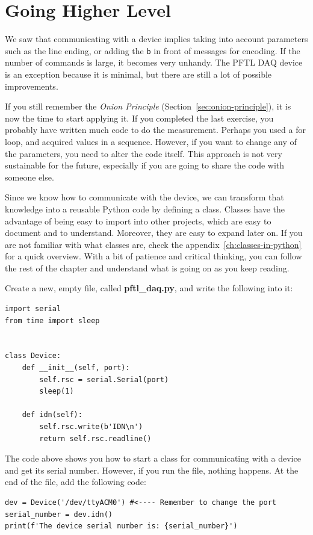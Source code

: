 \section{Going Higher Level}\label{sec:going-higher-level}
We saw that communicating with a device implies taking into account parameters such as the line ending, or adding the \texttt{b} in front of messages for encoding. If the number of commands is large, it becomes very unhandy. The {PFTL DAQ} device is an exception because it is minimal, but there are still a lot of possible improvements.

If you still remember the \emph{Onion Principle} (Section~\ref{sec:onion-principle}), it is now the time to start applying it. If you completed the last exercise, you probably have written much code to do the measurement. Perhaps you used a for loop, and acquired values in a sequence. However, if you want to change any of the parameters, you need to alter the code itself. This approach is not very sustainable for the future, especially if you are going to share the code with someone else.

Since we know how to communicate with the device, we can transform that knowledge into a reusable Python code by defining a class. Classes have the advantage of being easy to import into other projects, which are easy to document and to understand. Moreover, they are easy to expand later on. If you are not familiar with what classes are, check the appendix~\ref{ch:classes-in-python} for a quick overview. With a bit of patience and critical thinking, you can follow the rest of the chapter and understand what is going on as you keep reading.

Create a new, empty file, called \textbf{pftl\_daq.py}, and write the following into it:

\begin{verbatim}
import serial
from time import sleep


class Device:
    def __init__(self, port):
        self.rsc = serial.Serial(port)
        sleep(1)

    def idn(self):
        self.rsc.write(b'IDN\n')
        return self.rsc.readline()

\end{verbatim}

The code above shows you how to start a class for communicating with a device and get its serial number. However, if you run the file, nothing happens. At the end of the file, add the following code:

\begin{verbatim}
dev = Device('/dev/ttyACM0') #<---- Remember to change the port
serial_number = dev.idn()
print(f'The device serial number is: {serial_number}')
\end{verbatim}

